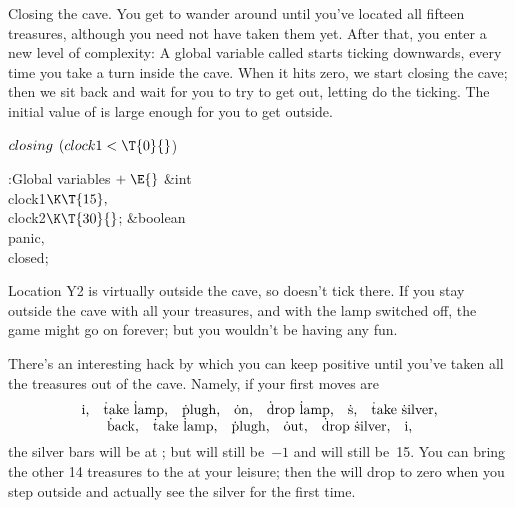 Closing the cave. You get to wander around until
you've located all
fifteen treasures, although you need not have taken them yet. After that,
you enter a new level of complexity: A global variable called
 starts ticking downwards, every time you take a turn inside the
cave.
When it hits zero, we start closing the cave; then we sit back and
wait for you to try to get out, letting  do the ticking.
The initial value of  is large enough for you to get outside.

\Y\B\4\D$\\{closing}$ \5
$(\\{clock1}<\T{0}{}$)\par
\Y\B\4:Global variables\X${}\mathrel+\E{}$\6
\&{int} \\{clock1}${}\K\T{15},{}$ \\{clock2}${}\K\T{30}{}$;\6
\&{boolean} \\{panic}${},{}$ \\{closed};\par
\fi

Location Y2 is virtually outside the cave, so  doesn't tick there.
If you stay outside the cave with all your treasures, and with the lamp
switched off, the game might go on forever; but you wouldn't be having
any fun.

There's an interesting hack by which you can keep  positive
until you've taken all the treasures out of the cave. Namely, if your
first moves are
$$\vcenter{\halign{\hfil\hbox{#}\hfil\cr
\.{in},\quad \.{take} \.{lamp},\quad \.{plugh},\quad \.{on},\quad \.{drop} %
\.{lamp},\quad \.s,\quad
\.{take} \.{silver},\cr
\.{back},\quad \.{take} \.{lamp},\quad \.{plugh},\quad \.{out},\quad
\.{drop} \.{silver},\quad \.{in},\cr}}$$
the silver bars will be at ; but  will
still be~$-1$
and  will still be~15. You can bring the other 14 treasures to
the
 at your leisure; then the  will drop to zero when
you step
outside and actually see the silver for the first time.


